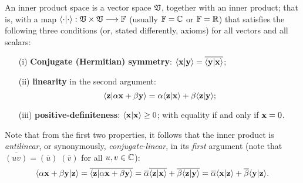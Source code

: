 An inner product space is a vector space $\frak V$,
together with an inner product; that is, with a map
 $\langle \cdot \vert \cdot \rangle :  \frak V  \times  \frak V  \longrightarrow {\Bbb F}$
 (usually ${\Bbb F}={\Bbb C}$ or ${\Bbb F}={\Bbb R}$)
 that satisfies the following three conditions (or, stated differently, axioms) for all vectors  and all scalars:
\begin{itemize}
\item[(i)]
{\bf Conjugate (Hermitian) symmetry}:
$
\langle {\bf x}\vert {\bf y}\rangle
=
\overline{\langle {\bf y}\vert {\bf x}\rangle }$;
\item[(ii)]
{\bf linearity} in the second argument:
$$
\langle {\bf z}  \vert \alpha{\bf x} + \beta {\bf y} \rangle
=
\alpha {\langle {\bf z}\vert {\bf x}\rangle}
+
\beta {\langle {\bf z}\vert {\bf y}\rangle}
;
$$
\item[(iii)]
\label{2016-m-ch-fdvs-pd}
{\bf positive-definiteness}:
$
\langle {\bf x}\vert {\bf x}\rangle
\ge
0$;  with equality if and only if ${\bf x} = 0$.
\end{itemize}

Note that from the first two properties, it follows that the inner product is
{\em antilinear}, or synonymously,
{\em conjugate-linear}, in its {\em first} argument (note that $\overline{(uv)}= (\overline{u}) {\;} (\overline{v}) $ for all $u,v\in {\Bbb C}$):
\begin{equation}
\begin{split}
 \langle \alpha {\bf x} + \beta {\bf y}   \vert {\bf z}\rangle
 =
 \overline{\langle   {\bf z} \vert \alpha {\bf x} + \beta {\bf y}\rangle }
 =
 \overline{ \alpha}\overline{\langle {\bf z} \vert {\bf x} \rangle}
 + \overline{\beta }\overline{\langle {\bf z} \vert {\bf y} \rangle}
 =
 \overline{\alpha} {\langle {\bf x}\vert {\bf z}\rangle}
 +\overline{\beta} {\langle {\bf y}\vert {\bf z}\rangle}
.
\end{split}
\end{equation}



